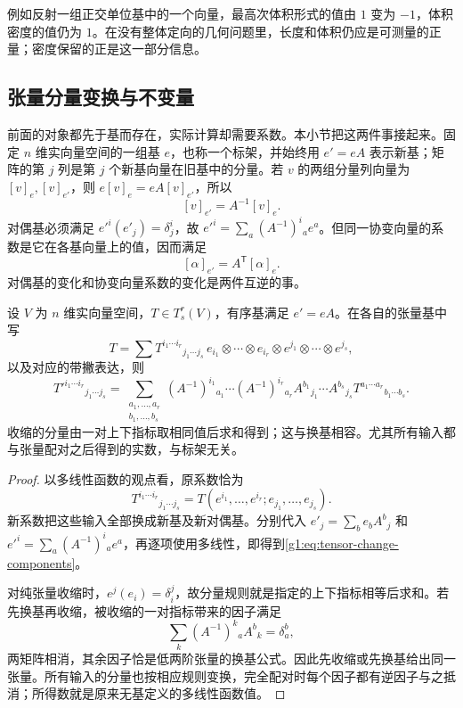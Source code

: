 例如反射一组正交单位基中的一个向量，最高次体积形式的值由 \(1\) 变为 \(-1\)，体积密度的值仍为 \(1\)。在没有整体定向的几何问题里，长度和体积仍应是可测量的正量；密度保留的正是这一部分信息。

\subsection{张量分量变换与不变量}
\label{g1:subsec:1202:05}

前面的对象都先于基而存在，实际计算却需要系数。本小节把这两件事接起来。固定 \(n\) 维实向量空间的一组基 \(e\)，也称一个标架，并始终用 \(e'=eA\) 表示新基；矩阵的第 \(j\) 列是第 \(j\) 个新基向量在旧基中的分量。若 \(v\) 的两组分量列向量为 \([v]_e,[v]_{e'}\)，则 \(e[v]_e=eA[v]_{e'}\)，所以
\[
	[v]_{e'}=A^{-1}[v]_e.
\]
对偶基必须满足 \(e'^i(e'_j)=\delta^i_j\)，故 \(e'^i=\sum_a(A^{-1})^i{}_a e^a\)。但同一协变向量的系数是它在各基向量上的值，因而满足
\[
	[\alpha]_{e'}=A^{\mathsf T}[\alpha]_e.
\]
对偶基的变化和协变向量系数的变化是两件互逆的事。

\begin{proposition}
	\label{g1:prop:tensor-component-change}
	设 \(V\) 为 \(n\) 维实向量空间，\(T\in T^r_s(V)\)，有序基满足 \(e'=eA\)。在各自的张量基中写
	\[
		T=\sum T^{i_1\cdots i_r}{}_{j_1\cdots j_s}
		\,e_{i_1}\otimes\cdots\otimes e_{i_r}\otimes e^{j_1}\otimes\cdots\otimes e^{j_s},
	\]
	以及对应的带撇表达，则
	\begin{equation}
		\label{g1:eq:tensor-change-components}
		T'^{i_1\cdots i_r}{}_{j_1\cdots j_s}
		=\sum_{\substack{a_1,\ldots,a_r\\ b_1,\ldots,b_s}}
		(A^{-1})^{i_1}{}_{a_1}\cdots(A^{-1})^{i_r}{}_{a_r}
		A^{b_1}{}_{j_1}\cdots A^{b_s}{}_{j_s}
		T^{a_1\cdots a_r}{}_{b_1\cdots b_s}.
	\end{equation}
	收缩的分量由一对上下指标取相同值后求和得到；这与换基相容。尤其所有输入都与张量配对之后得到的实数，与标架无关。
\end{proposition}
\begin{proof}
	以多线性函数的观点看，原系数恰为
	\[
		T^{i_1\cdots i_r}{}_{j_1\cdots j_s}
		=T(e^{i_1},\ldots,e^{i_r};e_{j_1},\ldots,e_{j_s}).
	\]
	新系数把这些输入全部换成新基及新对偶基。分别代入 \(e'_j=\sum_b e_bA^b{}_j\) 和 \(e'^i=\sum_a(A^{-1})^i{}_a e^a\)，再逐项使用多线性，即得到\eqref{g1:eq:tensor-change-components}。

	对纯张量收缩时，\(e^j(e_i)=\delta_i^j\)，故分量规则就是指定的上下指标相等后求和。若先换基再收缩，被收缩的一对指标带来的因子满足
	\[
		\sum_k(A^{-1})^k{}_a A^b{}_k=\delta^b_a,
	\]
	两矩阵相消，其余因子恰是低两阶张量的换基公式。因此先收缩或先换基给出同一张量。所有输入的分量也按相应规则变换，完全配对时每个因子都有逆因子与之抵消；所得数就是原来无基定义的多线性函数值。
\end{proof}

